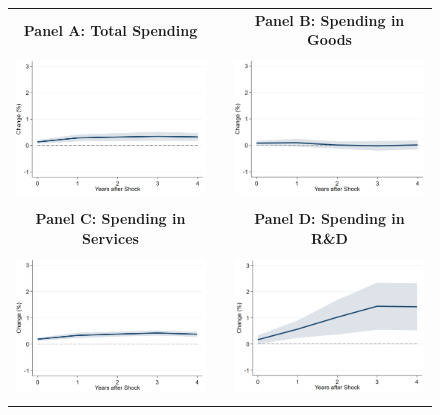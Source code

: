 \documentclass[dv_diss_main.tex]{subfiles}
\begin{document}
\begin{figure}[H]
    \begin{center}
    \begin{tabular}[c]{ccc}
    
    \normalsize{\bf Panel A: Total Spending} & & \normalsize{\bf Panel B: Spending in Goods} \\
    {\includegraphics[height=1.5in,width=2.8in]{figures/graph_Rn_emp_lv_Rn_ms_lv.png}} & & {\includegraphics[height=1.5in,width=2.8in]{figures/graph_Rn_emp_lv_Rn_ms_goods_lv.png}} \\[0.1in]
    
    \normalsize{\bf Panel C: Spending in Services} & & \normalsize{\bf Panel D: Spending in R\&D} \\
    {\includegraphics[height=1.5in,width=2.8in]{figures/graph_Rn_emp_lv_Rn_ms_services_lv.png}} & & {\includegraphics[height=1.5in,width=2.8in]{figures/graph_Rn_emp_lv_Rn_ms_rd_lv.png}} \\[0.1in]
    

\end{tabular}
\end{center}
\end{figure}
\end{document}
